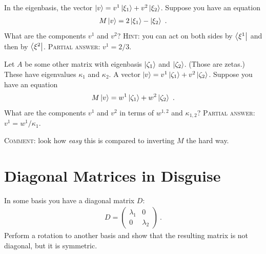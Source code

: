 \documentclass[12pt, oneside]{report}    %
\let\oldsection\section
\def\section{%
  \setcounter{sidenote}{1}%
  \oldsection
}
\begin{document}
\begin{exercise}
In the eigenbasis, the vector $\left|v\right\rangle = v^1\left|\xi_1\right\rangle + v^2 \left|\xi_2\right\rangle$. Suppose you have an equation
\begin{align}
    M\left|v\right\rangle = 2 \left|\xi_1\right\rangle -  \left|\xi_2\right\rangle \ .
\end{align}
What are the components $v^1$ and $v^2$? \textsc{Hint}: you can act on both sides by $\left\langle\xi^1\right|$ and then by $\left\langle\xi^2\right|$. \textsc{Partial answer:} $v^1 = 2/3$. 
\end{exercise}

\begin{exercise}
Let $A$ be some other matrix with eigenbasis $\left|\zeta_1\right\rangle$ and $\left|\zeta_2\right\rangle$. (Those are zetas.) These have eigenvalues $\kappa_1$ and $\kappa_2$. A vector $\left|v\right\rangle = v^1\left|\zeta_1\right\rangle + v^2 \left|\zeta_2\right\rangle$. Suppose you have an equation
\begin{align}
    M\left|v\right\rangle = w^1 \left|\zeta_1\right\rangle +  w^2\left|\zeta_2\right\rangle \ .
\end{align}
What are the components $v^1$ and $v^2$ in terms of $w^{1,2}$ and $\kappa_{1,2}$? \textsc{Partial answer:} $v^1 = w^1/\kappa_1$.

\textsc{Comment}: look how \emph{easy} this is compared to inverting $M$ the hard way. 
\end{exercise}



\section{Diagonal Matrices in Disguise}

\begin{exercise} In some basis you have a diagonal matrix $D$:
\begin{align}
D =
\begin{pmatrix}
    \lambda_1 & 0 \\
    0 & \lambda_2
\end{pmatrix}     \ .
\end{align}
Perform a rotation to another basis and show that the resulting matrix is not diagonal, but it is symmetric. 
\end{exercise}
\end{document}
